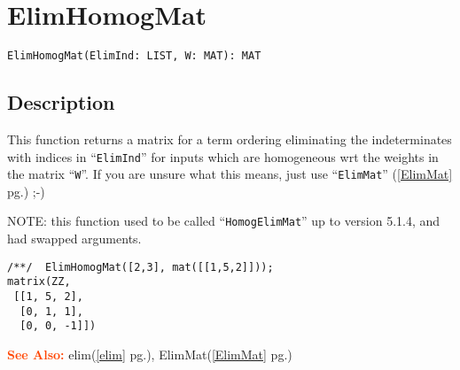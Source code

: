 \documentclass[a4paper]{mybook}
\newenvironment{command}{}{} %
\newcommand\SeeAlso{\par\textcolor{OrangeRed}{\textbf{\large See Also: }}}
\begin{document}
\section{ElimHomogMat}
\label{ElimHomogMat}
\begin{command} %


\begin{Verbatim}[label=syntax, rulecolor=\color{MidnightBlue},
frame=single]
ElimHomogMat(ElimInd: LIST, W: MAT): MAT
\end{Verbatim}


\subsection*{Description}

This function returns a matrix for a term ordering eliminating the
indeterminates with indices in ``\verb&ElimInd&'' for inputs which are
homogeneous wrt the weights in the matrix ``\verb&W&''.
If you are unsure what this means, just use ``\verb&ElimMat&'' (\ref{ElimMat} pg.\pageref{ElimMat}) ;-)
\par 
NOTE: this function used to be called ``\verb&HomogElimMat&'' up to version 5.1.4,
and had swapped arguments.
\begin{Verbatim}[label=example, rulecolor=\color{PineGreen}, frame=single]
/**/  ElimHomogMat([2,3], mat([[1,5,2]]));
matrix(ZZ,
 [[1, 5, 2],
  [0, 1, 1],
  [0, 0, -1]])
\end{Verbatim}


\SeeAlso %
  elim(\ref{elim} pg.\pageref{elim}), 
    ElimMat(\ref{ElimMat} pg.\pageref{ElimMat})
\end{command} %
\end{document}

